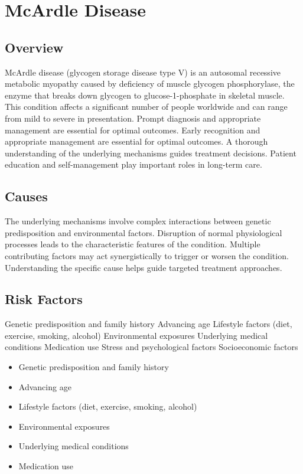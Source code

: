 \chapter{McArdle Disease}
\label{sec:McArdle Disease}

\section{Overview}
McArdle disease (glycogen storage disease type V) is an autosomal recessive metabolic myopathy caused by deficiency of muscle glycogen phosphorylase, the enzyme that breaks down glycogen to glucose-1-phosphate in skeletal muscle. This condition affects a significant number of people worldwide and can range from mild to severe in presentation. Prompt diagnosis and appropriate management are essential for optimal outcomes. Early recognition and appropriate management are essential for optimal outcomes. A thorough understanding of the underlying mechanisms guides treatment decisions. Patient education and self-management play important roles in long-term care.
\section{Causes}
The underlying mechanisms involve complex interactions between genetic predisposition and environmental factors. Disruption of normal physiological processes leads to the characteristic features of the condition. Multiple contributing factors may act synergistically to trigger or worsen the condition. Understanding the specific cause helps guide targeted treatment approaches.
\section{Risk Factors}
Genetic predisposition and family history Advancing age Lifestyle factors (diet, exercise, smoking, alcohol) Environmental exposures Underlying medical conditions Medication use Stress and psychological factors Socioeconomic factors

\begin{itemize}[noitemsep]
  \item Genetic predisposition and family history
  \item Advancing age
  \item Lifestyle factors (diet, exercise, smoking, alcohol)
  \item Environmental exposures
  \item Underlying medical conditions
  \item Medication use
\end{itemize}
